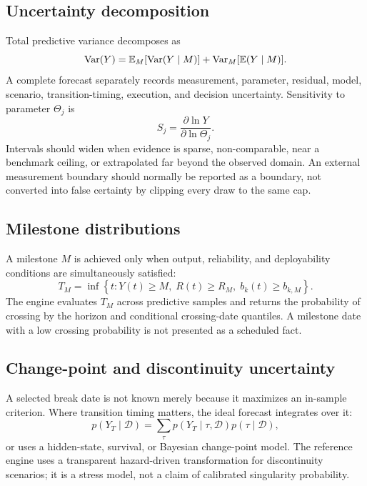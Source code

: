 \subsection{Uncertainty decomposition}

Total predictive variance decomposes as
\begin{equation}
\operatorname{Var}(Y)=\mathbb{E}_M[\operatorname{Var}(Y\mid M)]+\operatorname{Var}_M[\mathbb{E}(Y\mid M)].
\end{equation}
A complete forecast separately records measurement, parameter, residual, model, scenario, transition-timing, execution, and decision uncertainty. Sensitivity to parameter $\Theta_j$ is
\begin{equation}
S_j=\frac{\partial\ln Y}{\partial\ln\Theta_j}.
\end{equation}
Intervals should widen when evidence is sparse, non-comparable, near a benchmark ceiling, or extrapolated far beyond the observed domain. An external measurement boundary should normally be reported as a boundary, not converted into false certainty by clipping every draw to the same cap.

\subsection{Milestone distributions}

A milestone $M$ is achieved only when output, reliability, and deployability conditions are simultaneously satisfied:
\begin{equation}
T_M=\inf\left\{t:Y(t)\ge M,\;R(t)\ge R_M,\;b_k(t)\ge b_{k,M}\right\}.
\end{equation}
The engine evaluates $T_M$ across predictive samples and returns the probability of crossing by the horizon and conditional crossing-date quantiles. A milestone date with a low crossing probability is not presented as a scheduled fact.

\subsection{Change-point and discontinuity uncertainty}

A selected break date is not known merely because it maximizes an in-sample criterion. Where transition timing matters, the ideal forecast integrates over it:
\begin{equation}
p(Y_T\mid\mathcal D)=\sum_\tau p(Y_T\mid\tau,\mathcal D)p(\tau\mid\mathcal D),
\end{equation}
or uses a hidden-state, survival, or Bayesian change-point model. The reference engine uses a transparent hazard-driven transformation for discontinuity scenarios; it is a stress model, not a claim of calibrated singularity probability.
